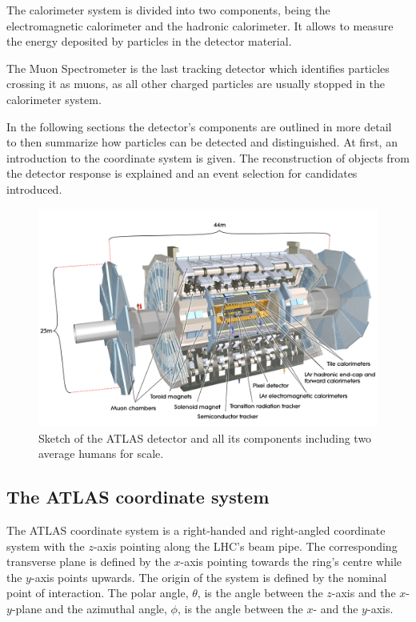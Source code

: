 The calorimeter system is divided into two components, being the electromagnetic calorimeter and the hadronic calorimeter. It allows to measure the energy deposited by particles in the detector material.

The Muon Spectrometer is the last tracking detector which identifies particles crossing it as muons, as all other charged particles are usually stopped in the calorimeter system.

In the following sections the detector's components are outlined in more detail~\cite{wermes} to then summarize how particles can be detected and distinguished. At first, an introduction to the coordinate system is given. The reconstruction of objects from the detector response is explained and an event selection for \tW candidates introduced.



\begin{figure}[htbp]
  \centering
  \includegraphics[scale=0.15]{figures_LHC/atlas-detector}
  \caption[Sketch of the ATLAS detector]{Sketch of the ATLAS detector and all its components including two average humans for scale.~\cite{Pequenao:1095924}}
  \label{fig:atlas}
\end{figure}

\subsection{The ATLAS coordinate system}

The ATLAS coordinate system is a right-handed and right-angled coordinate system with the $z$-axis pointing along the LHC's beam pipe. The corresponding transverse plane is defined by the $x$-axis pointing towards the ring's centre while the $y$-axis points upwards. The origin of the system is defined by the nominal point of interaction. The polar angle, $\theta$, is the angle between the $z$-axis and the $x$-$y$-plane and the azimuthal angle, $\phi$, is the angle between the $x$- and the $y$-axis.

